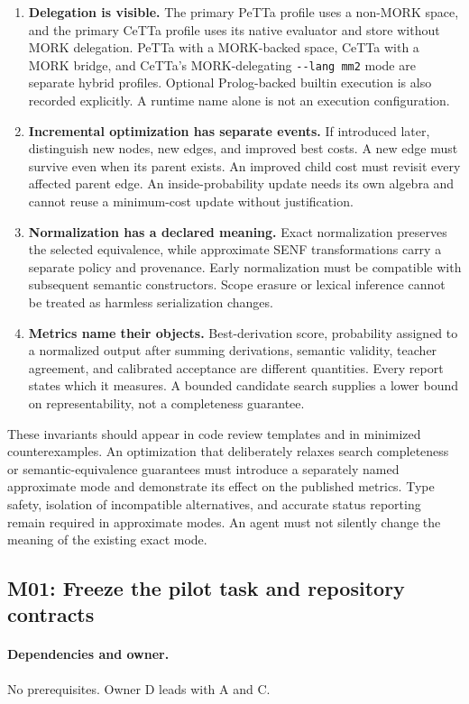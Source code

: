 \documentclass[11pt,a4paper]{article}
\begin{document}
\begin{enumerate}
\item \textbf{Delegation is visible.} The primary PeTTa profile uses a
non-MORK space, and the primary CeTTa profile uses its native evaluator and
store without MORK delegation. PeTTa with a MORK-backed space, CeTTa with a
MORK bridge, and CeTTa's MORK-delegating \texttt{-{}-lang mm2} mode are
separate hybrid profiles. Optional Prolog-backed builtin execution is also
recorded explicitly. A runtime name alone is not an execution configuration.
\item \textbf{Incremental optimization has separate events.} If introduced later, distinguish new nodes, new edges, and improved best costs. A new edge must survive even when its parent exists. An improved child cost must revisit every affected parent edge. An inside-probability update needs its own algebra and cannot reuse a minimum-cost update without justification.
\item \textbf{Normalization has a declared meaning.} Exact normalization preserves the selected equivalence, while approximate SENF transformations carry a separate policy and provenance. Early normalization must be compatible with subsequent semantic constructors. Scope erasure or lexical inference cannot be treated as harmless serialization changes.
\item \textbf{Metrics name their objects.} Best-derivation score, probability assigned to a normalized output after summing derivations, semantic validity, teacher agreement, and calibrated acceptance are different quantities. Every report states which it measures. A bounded candidate search supplies a lower bound on representability, not a completeness guarantee.
\end{enumerate}

These invariants should appear in code review templates and in minimized counterexamples. An optimization that deliberately relaxes search completeness or semantic-equivalence guarantees must introduce a separately named approximate mode and demonstrate its effect on the published metrics. Type safety, isolation of incompatible alternatives, and accurate status reporting remain required in approximate modes. An agent must not silently change the meaning of the existing exact mode.

\subsection{M01: Freeze the pilot task and repository contracts}

\paragraph{Dependencies and owner.} No prerequisites. Owner D leads with A and C.
\end{document}
